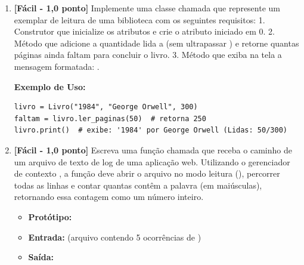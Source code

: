 \begin{enumerate}[label=\textbf{Q\arabic*.}, start=64]


\vspace{0.4cm}

\item \textbf{[Fácil - 1,0 ponto]} Implemente uma classe chamada  que represente um exemplar de leitura de uma biblioteca com os seguintes requisitos:
1. Construtor  que inicialize os atributos e crie o atributo  iniciado em $0$.
2. Método  que adicione a quantidade lida a  (sem ultrapassar ) e retorne quantas páginas ainda faltam para concluir o livro.
3. Método  que exiba na tela a mensagem formatada: .

\textbf{Exemplo de Uso:}
\begin{verbatim}
livro = Livro("1984", "George Orwell", 300)
faltam = livro.ler_paginas(50)  # retorna 250
livro.print()  # exibe: '1984' por George Orwell (Lidas: 50/300)
\end{verbatim}



\vspace{0.4cm}

\item \textbf{[Fácil - 1,0 ponto]} Escreva uma função chamada  que receba o caminho de um arquivo de texto  de log de uma aplicação web. Utilizando o gerenciador de contexto , a função deve abrir o arquivo no modo leitura (), percorrer todas as linhas e contar quantas contêm a palavra  (em maiúsculas), retornando essa contagem como um número inteiro.

\begin{itemize}[leftmargin=*]
    \item \textbf{Protótipo:}\newline {}
    \item \textbf{Entrada:}  (arquivo contendo 5 ocorrências de )
    \item \textbf{Saída:} 
\end{itemize}



\vspace{0.4cm}


\end{enumerate}
